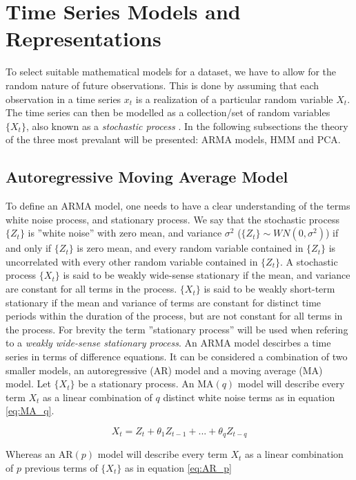 \section{Time Series Models and Representations} \label{sec:ts_models}
To select suitable mathematical models for a dataset, we have to allow for the random nature of future observations. 
This is done by assuming that each observation in a time series $x_t$ is a realization of a particular random variable $X_t$. 
The time series can then be modelled as a collection/set of random variables $\{X_t\}$, also known as a \textit{stochastic process} \cite{brockwell_davis_advanced}. 
In the following subsections the theory of the three most prevalant will be presented: ARMA models, HMM and PCA.

\subsection{Autoregressive Moving Average Model}
To define an ARMA model, one needs to have a clear understanding of the terms white noise process, and stationary process. 
We say that the stochastic process $\{Z_t\}$ is ''white noise'' with zero mean, and variance $\sigma^2$ ($\{Z_t\} \sim WN(0, \sigma^2)$) if and only if $\{Z_t\}$ is zero mean, and every random variable contained in $\{Z_t\}$ is uncorrelated with every other random variable contained in $\{Z_t\}$. 
A stochastic process $\{X_t\}$ is said to be weakly wide-sense stationary if the mean, and variance are constant for all terms in the process. 
$\{X_t\}$ is said to be weakly short-term stationary if the mean and variance of terms are constant for distinct time periods within the duration of the process, but are not constant for all terms in the process. 
For brevity the term ''stationary process'' will be used when refering to a \textit{weakly wide-sense stationary process}. 
An ARMA model descirbes a time series in terms of difference equations. 
It can be considered a combination of two smaller models, an autoregressive (AR) model and a moving average (MA) model. 
Let $\{X_t\}$ be a stationary process. 
An $\mathrm{MA}(q)$ model will describe every term $X_t$ as a linear combination of $q$ distinct white noise terms as in equation \eqref{eq:MA_q}.

\begin{equation}
    X_t = Z_{t} + \theta_1 Z_{t-1} + ... + \theta_q Z_{t-q}
    \label{eq:MA_q}
\end{equation}

Whereas an $\mathrm{AR}(p)$ model will describe every term $X_t$ as a linear combination of $p$ previous terms of $\{X_t\}$ as in equation \eqref{eq:AR_p}

